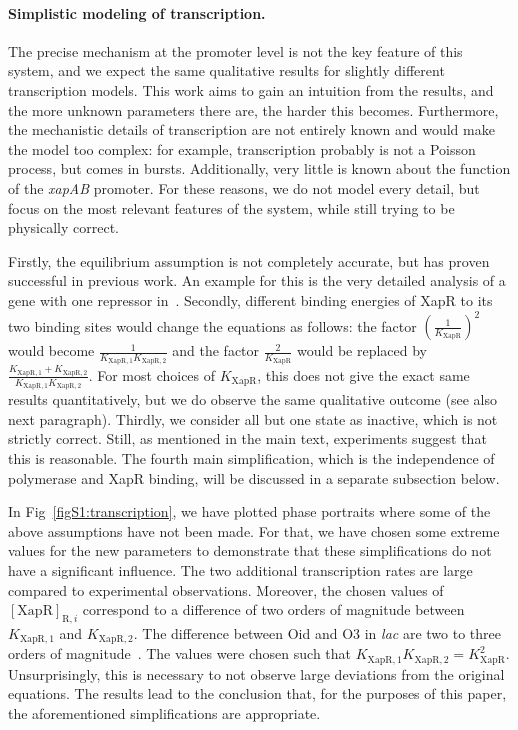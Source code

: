 \documentclass[10pt,letterpaper]{article}
\newcommand{\n}[1]{\mathrm{#1}}
\begin{document}
\paragraph*{Simplistic modeling of transcription.}
The precise mechanism at the promoter level is not the key feature of this
system, and we expect the same qualitative results for slightly different
transcription models. This work aims to gain an intuition from the results,
and the more unknown parameters there are, the harder this becomes.
Furthermore, the mechanistic details of transcription are not entirely known
and would make the model too complex: for example, transcription probably is
not a Poisson process, but comes in bursts. Additionally, very little is
known about the function of the \emph{xapAB} promoter. For these reasons, we
do not model every detail, but focus on the most relevant features of the
system, while still trying to be physically correct.

Firstly, the equilibrium assumption is not completely accurate, but has
proven successful in previous work. An example for this is the very detailed
analysis of a gene with one repressor in~\cite{Phillips2018}. Secondly,
different binding energies of XapR to its two binding sites would change the
equations as follows: the factor $\left(\frac{1}{K_{\n{XapR}}}\right)^2$
would become $\frac{1}{K_{\n{XapR,1}} K_{\n{XapR,2}}}$ and the factor
$\frac{2}{K_{\n{XapR}}}$ would be replaced by $\frac{K_{\n{XapR,1}} +
K_{\n{XapR,2}}}{K_{\n{XapR,1}} K_{\n{XapR,2}}}$. For most choices of
$K_{\n{XapR}}$, this does not give the exact same results quantitatively,
but we do observe the same qualitative outcome (see also next paragraph).
Thirdly, we consider all but one state as inactive, which is not strictly
correct. Still, as mentioned in the main text, experiments suggest that this
is reasonable. The fourth main simplification, which is the independence of
polymerase and XapR binding, will be discussed in a separate subsection
below.

In Fig~\ref{figS1:transcription}, we have plotted phase portraits where some
of the above assumptions have not been made. For that, we have chosen some
extreme values for the new parameters to demonstrate that these
simplifications do not have a significant influence. The two additional
transcription rates are large compared to experimental observations.
Moreover, the chosen values of $\n{[XapR]}_{\n{R},i}$ correspond to a
difference of two orders of magnitude between $K_{\n{XapR,1}}$ and
$K_{\n{XapR,2}}$. The difference between Oid and O3 in \emph{lac} are two to
three orders of magnitude~\cite{RazoMejia2018}. The values were chosen such
that $K_{\n{XapR,1}} K_{\n{XapR,2}} = K_{\n{XapR}}^2$. Unsurprisingly, this
is necessary to not observe large deviations from the original equations.
The results lead to the conclusion that, for the purposes of this paper, the
aforementioned simplifications are appropriate.
\end{document}
